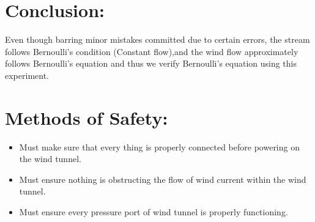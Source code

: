 \documentclass[12pt,a4paper]{article}
\begin{document}
\section{Conclusion:}
Even though barring minor mistakes committed due to certain errors, the stream follows Bernoulli’s condition (Constant flow),and the wind flow approximately follows Bernoulli’s equation and thus we verify Bernoulli’s equation using this experiment.
\section{Methods of Safety:}
\begin{itemize}
\item Must make sure that every thing is properly connected before powering on the wind tunnel.
\item Must ensure nothing is obstructing the flow of wind current within the wind tunnel.
\item Must ensure every pressure port of wind tunnel is properly functioning.
\end{itemize}
\end{document}
